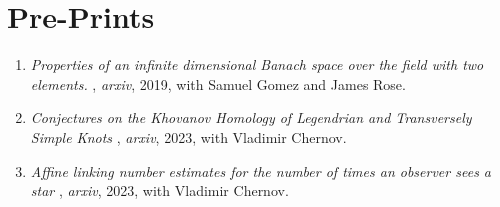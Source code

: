 \documentclass[a4paper,sans]{moderncv}
\begin{document}
    \section{Pre-Prints}
        \begin{enumerate}
            \item
                \textit{%
                    Properties of an infinite dimensional
                    Banach space over the field with two elements.%
                },
                \textit{arxiv}, 2019, with Samuel Gomez and James Rose.
            \item
                \textit{%
                    Conjectures on the Khovanov Homology of
                    Legendrian and Transversely Simple Knots%
                },
                \textit{arxiv}, 2023, with Vladimir Chernov.
            \item
                \textit{%
                    Affine linking number estimates for the number of
                    times an observer sees a star%
                },
                \textit{arxiv}, 2023, with Vladimir Chernov.
        \end{enumerate}
\end{document}
